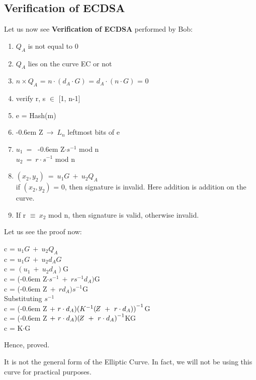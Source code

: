 \documentclass[11pt]{article}
\newcommand{\zbar}{\raisebox{0.2ex}{--}\kern-0.6em Z}
\begin{document}
\subsection{Verification of ECDSA}
Let us now see \textbf{Verification of ECDSA} performed by Bob:
\begin{enumerate}
    \item $Q_A$ is not equal to 0
    \item $Q_A$ lies on the curve EC or not
    \item $n\times Q_A$ = $n \cdot (d_A \cdot G)$ = $d_A \cdot (n \cdot G)$ = 0
    \item verify r, s $\in$ [1, n-1]
    \item e = Hash(m)
    \item \zbar $\ \rightarrow\ L_n$ leftmost bits of e
    \item $u_1 \ =\ $ \zbar$\cdot s^{-1}$ mod n\\
    $u_2\ =\ r \cdot s^{-1}$ mod n
    \item $(x_2, y_2)\ =\ u_1G\ +\ u_2Q_A$\\
    if $(x_2, y_2)$ = 0, then signature is invalid. Here addition is addition on the curve.
    \item If r $\equiv\ x_2$ mod n, then signature is valid, otherwise invalid.
\end{enumerate}
Let us see the proof now:\\
\begin{center}
    c = $u_1G\ +\ u_2Q_A$\\
    c = $u_1G\ +\ u_2d_AG$\\
    c = $(u_1\ +\ u_2d_A)$G\\
    c = (\zbar$\cdot s^{-1}\ +\ rs^{-1}d_A)$G\\
    c = (\zbar $\ +\ rd_A)s^{-1}$G\\
    Substituting $s^{-1}$\\
    c = (\zbar $\ +\ r\cdot d_A){(K^{-1}(\zbar\ +\ r\cdot d_A))}^{-1}$G\\
    c = (\zbar $\ +\ r\cdot d_A){(\zbar\ +\ r \cdot d_A)}^{-1}$KG\\
    c = K$\cdot$G
\end{center}
Hence, proved.

It is not the general form of the Elliptic Curve. In fact, we will not be using this curve for practical purposes.
\end{document}
